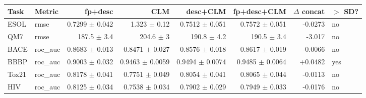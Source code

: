 \begin{tabular}{llrrrrrl}
\hline
Task & Metric & fp+desc & CLM & desc+CLM & fp+desc+CLM & $\Delta$ concat & $>$ SD? \\
\hline
ESOL & rmse & 0.7299 $\pm$ 0.042 & 1.323 $\pm$ 0.12 & 0.7512 $\pm$ 0.051 & 0.7572 $\pm$ 0.051 & -0.0273 & no \\
QM7 & rmse & 187.5 $\pm$ 3.4 & 204.6 $\pm$ 3 & 190.8 $\pm$ 4.2 & 190.5 $\pm$ 3.4 & -3.017 & no \\
BACE & roc_auc & 0.8683 $\pm$ 0.013 & 0.8471 $\pm$ 0.027 & 0.8576 $\pm$ 0.018 & 0.8617 $\pm$ 0.019 & -0.0066 & no \\
BBBP & roc_auc & 0.9003 $\pm$ 0.032 & 0.9463 $\pm$ 0.0059 & 0.9494 $\pm$ 0.0074 & 0.9485 $\pm$ 0.0064 & +0.0482 & yes \\
Tox21 & roc_auc & 0.8178 $\pm$ 0.041 & 0.7751 $\pm$ 0.049 & 0.8054 $\pm$ 0.041 & 0.8065 $\pm$ 0.044 & -0.0113 & no \\
HIV & roc_auc & 0.8125 $\pm$ 0.034 & 0.7538 $\pm$ 0.034 & 0.7902 $\pm$ 0.029 & 0.7949 $\pm$ 0.033 & -0.0176 & no \\
\hline
\end{tabular}
